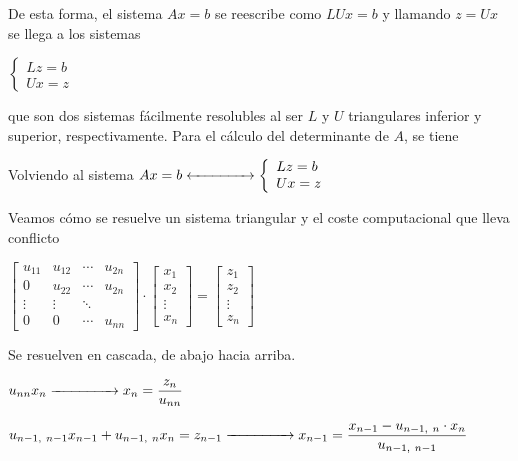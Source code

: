 \documentclass[12pt]{article}
\begin{document}
De esta forma, el sistema $Ax=b$ se reescribe como $LUx=b$ y
llamando $z=Ux$ se llega a los sistemas

\hspace{1cm}$\left\lbrace\begin{array}{l}
Lz=b\\
Ux=z
\end{array}\right.$

que son dos sistemas fácilmente resolubles al ser $L$ y $U$
triangulares inferior y superior, respectivamente. Para el
cálculo del determinante de $A$, se tiene

\begin{center}
\end{center}
Volviendo al sistema
$Ax=b\xleftrightarrow{\hspace{1.5cm}}\left\lbrace\begin{array}{l}
Lz=b\\
Ux=z
\end{array}\right.$

Veamos cómo se resuelve un sistema triangular y el coste
computacional que lleva conflicto

$\begin{bmatrix}
u_{11} & u_{12} & \cdots & u_{2n} \\ 
0 & u_{22} & \cdots & u_{2n} \\ 
\vdots & \vdots & \ddots &  \\ 
0 & 0 & \cdots & u_{nn}
\end{bmatrix}\cdot\begin{bmatrix}
x_1\\
x_2\\
\vdots\\
x_n
\end{bmatrix}=\begin{bmatrix}
z_1\\
z_2\\
\vdots\\
z_n
\end{bmatrix}$

Se resuelven en cascada, de abajo hacia arriba.

$u_{nn}x_{n}\xrightarrow{\hspace{1.5cm}}x_{n}=\dfrac{z_{n}}{u_{nn}}$

$u_{n-1,~n-1}x_{n-1}+u_{n-1,~n}x_{n}=z_{n-1}\xrightarrow{\hspace{1.5cm}}x_{n-1}=\dfrac{x_{n-1}-u_{n-1,~n}\cdot
x_n}{u_{n-1,~n-1}}$
\end{document}
